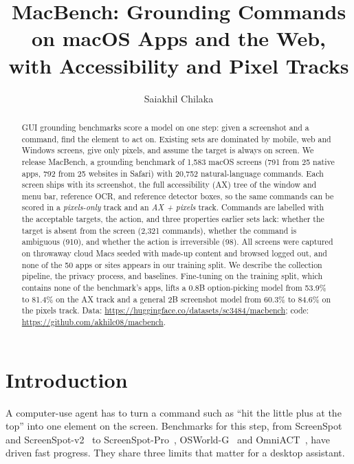 \documentclass[sigconf,screen,review]{acmart}
\newcommand{\bench}{MacBench}
\begin{document}
\title{\bench{}: Grounding Commands on macOS Apps and the Web,\\with Accessibility and Pixel Tracks}

\author{Saiakhil Chilaka}

\begin{abstract}
GUI grounding benchmarks score a model on one step: given a screenshot and a command, find the element to act on. Existing sets are dominated by mobile, web and Windows screens, give only pixels, and assume the target is always on screen. We release \bench{}, a grounding benchmark of 1,583 macOS screens (791 from 25 native apps, 792 from 25 websites in Safari) with 20,752 natural-language commands. Each screen ships with its screenshot, the full accessibility (AX) tree of the window and menu bar, reference OCR, and reference detector boxes, so the same commands can be scored in a \emph{pixels-only} track and an \emph{AX + pixels} track. Commands are labelled with the acceptable targets, the action, and three properties earlier sets lack: whether the target is absent from the screen (2,321 commands), whether the command is ambiguous (910), and whether the action is irreversible (98). All screens were captured on throwaway cloud Macs seeded with made-up content and browsed logged out, and none of the 50 apps or sites appears in our training split. We describe the collection pipeline, the privacy process, and baselines. Fine-tuning on the training split, which contains none of the benchmark's apps, lifts a 0.8B option-picking model from 53.9\% to 81.4\% on the AX track and a general 2B screenshot model from 60.3\% to 84.6\% on the pixels track. Data: \url{https://huggingface.co/datasets/sc3484/macbench}; code: \url{https://github.com/akhilc08/macbench}.
\end{abstract}

\maketitle

\section{Introduction}
A computer-use agent has to turn a command such as ``hit the little plus at the top'' into one element on the screen. Benchmarks for this step, from ScreenSpot~\cite{seeclick} and ScreenSpot-v2~\cite{osatlas} to ScreenSpot-Pro~\cite{sspro}, OSWorld-G~\cite{jedi} and OmniACT~\cite{omniact}, have driven fast progress. They share three limits that matter for a desktop assistant.
\end{document}
